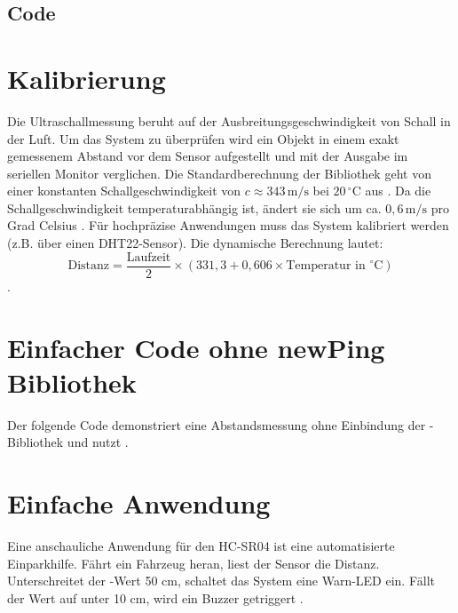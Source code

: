 \subsection{Code}

\begin{center}
	 \label{code:Beispiel}  
\end{center}


\section{Kalibrierung}
Die Ultraschallmessung beruht auf der Ausbreitungsgeschwindigkeit von Schall in der Luft. Um das System zu überprüfen wird ein Objekt in einem exakt gemessenem Abstand vor dem Sensor aufgestellt und mit der Ausgabe im seriellen Monitor verglichen. Die Standardberechnung der Bibliothek geht von einer konstanten Schallgeschwindigkeit von $c \approx 343 \, \text{m/s}$ bei $20\,^\circ\text{C}$ aus \cite{Fraden:2016} . Da die Schallgeschwindigkeit temperaturabhängig ist, ändert sie sich um ca. $0,6 \, \text{m/s}$ pro Grad Celsius \cite{Fraden:2016}. Für hochpräzise Anwendungen muss das System kalibriert werden (z.B. über einen DHT22-Sensor). Die dynamische Berechnung lautet:
\[ \text{Distanz} = \frac{\text{Laufzeit}}{2} \times \left(331,3 + 0,606 \times \text{Temperatur in } ^\circ\text{C}\right) \].

\section{Einfacher Code ohne newPing Bibliothek}
Der folgende Code demonstriert eine Abstandsmessung ohne Einbindung der -Bibliothek und nutzt .

\begin{center}
	\label{code: Beispiel2}  
\end{center}

\section{Einfache Anwendung}                                                                                                                  
Eine anschauliche Anwendung für den HC-SR04 ist eine automatisierte Einparkhilfe. Fährt ein Fahrzeug heran, liest der Sensor die Distanz. Unterschreitet der -Wert 50 cm, schaltet das System eine Warn-LED ein. Fällt der Wert auf unter 10 cm, wird ein Buzzer getriggert \cite{Eckel:2023}.

